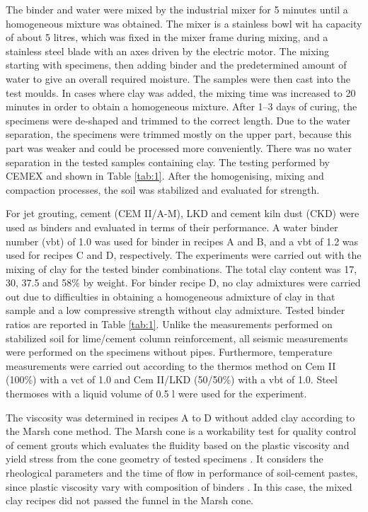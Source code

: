\documentclass[USenglish,twocolumn]{article}
\begin{document}
The binder and water were mixed by the industrial mixer for 5 minutes until a homogeneous mixture was obtained. The mixer is a stainless bowl wit ha capacity of about 5 litres, which was fixed in the mixer frame during mixing, and a stainless steel blade with an axes driven by the electric motor. The mixing starting with specimens, then adding binder and the predetermined amount of water to give an overall required moisture. The samples were then cast into the test moulds. In cases where clay was added, the mixing time was increased to 20 minutes in order to obtain a homogeneous mixture. After 1--3 days of curing, the specimens were de-shaped and trimmed to the correct length. Due to the water separation, the specimens were trimmed mostly on the upper part, because this part was weaker and could be processed more conveniently. There was no water separation in the tested samples containing clay. The testing performed by CEMEX and shown in Table \ref{tab:1}. After the homogenising, mixing and compaction processes, the soil was stabilized and evaluated for strength. 

For jet grouting, cement (CEM II/A-M), LKD and cement kiln dust (CKD) were used as binders and evaluated in terms of their performance. A water binder number (vbt) of 1.0 was used for binder in recipes A and B, and a vbt of 1.2 was used for recipes C and D, respectively. The experiments were carried out with the mixing of clay for the tested binder combinations. The total clay content was 17, 30, 37.5 and 58\% by weight. For binder recipe D, no clay admixtures were carried out due to difficulties in obtaining a homogeneous admixture of clay in that sample and a low compressive strength without clay admixture. Tested binder ratios are reported in Table \ref{tab:1}. Unlike the measurements performed on stabilized soil for lime/cement column reinforcement, all seismic measurements were performed on the specimens without pipes. Furthermore, temperature measurements were carried out according to the thermos method on Cem II (100\%) with a vct of 1.0 and Cem II/LKD (50/50\%) with a vbt of 1.0. Steel thermoses with a liquid volume of 0.5 l were used for the experiment.

The viscosity was determined in recipes A to D without added clay according to the Marsh cone method. The Marsh cone is a workability test for quality control of cement grouts which evaluates the fluidity based on the plastic viscosity and yield stress from the cone geometry of tested specimens \cite{ROUSSEL2005823}. It considers the rheological parameters and the time of flow in performance of soil-cement pastes, since plastic viscosity vary with composition of binders \cite{Banfill,FERRARIS2001245}. In this case, the mixed clay recipes did not passed the funnel in the Marsh cone. 
\end{document}
